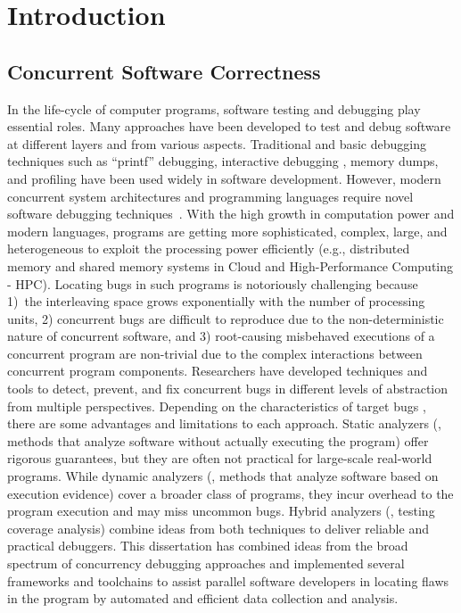 

\chapter{Introduction}
\label{sec:ch1}

\section{Concurrent Software Correctness}

In the life-cycle of computer programs, software testing and debugging play essential roles.
%
Many approaches have been developed to test and debug software at different layers and from various aspects.
%
Traditional and basic debugging techniques such as ``printf'' debugging, interactive debugging \cite{ddt, totalview}, memory dumps, and profiling have been used widely in software development.
%
%
However, modern concurrent system architectures and programming languages require novel software debugging techniques~\cite{hpcdoe}.
%
With the high growth in computation power and modern languages, programs are getting more sophisticated, complex, large, and heterogeneous to exploit the processing power efficiently (e.g., distributed memory and shared memory systems in  Cloud and High-Performance Computing - HPC).
%
Locating bugs in such programs is notoriously challenging because 1)~the interleaving space grows exponentially with the number of processing units, 2) concurrent bugs are difficult to reproduce due to the non-deterministic nature of concurrent software, and 3) root-causing misbehaved executions of a concurrent program are non-trivial due to the complex interactions between concurrent program components.
%
Researchers have developed techniques and tools to detect, prevent, and fix concurrent bugs in different levels of abstraction from multiple perspectives.
%
Depending on the characteristics of target bugs \cite{shanlu-mistakes-asplos08}, there are some advantages and limitations to each approach.
%
Static analyzers (\ie, methods that analyze software without actually executing the program) offer rigorous guarantees, but they are often not practical for large-scale real-world programs.
%
While dynamic analyzers (\ie, methods that analyze software based on execution evidence) cover a broader class of programs, they incur overhead to the program execution and may miss uncommon bugs.
%
Hybrid analyzers (\eg, testing coverage analysis) combine ideas from both techniques to deliver reliable and practical debuggers.
%
This dissertation has combined ideas from the broad spectrum of concurrency debugging approaches and implemented several frameworks and toolchains to assist parallel software developers in locating flaws in the program by automated and efficient data collection and analysis.

